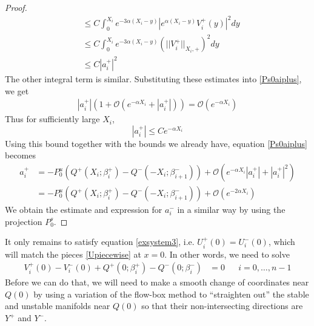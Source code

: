 \documentclass[thesis.tex]{subfiles}
\begin{document}
\begin{lemma}
\begin{proof}
\begin{align*}
&\leq C \int_0^{X_i}e^{-3 \alpha (X_i - y)} |e^{\alpha(X_i - y)} V_i^+(y)|^2 dy \\
&\leq C \int_0^{X_i}e^{-3 \alpha (X_i - y)} (||V_i^+||_{X_i, +})^2 dy \\
&\leq C |a_i^+|^2
\end{align*}
The other integral term is similar. Substituting these estimates into \eqref{Ps0aiplus}, we get
\begin{align*}
|a_i^+|\left(1 + \mathcal{O}(e^{-\alpha X_i} + |a_i^+|) \right) =  
\mathcal{O}( e^{-\alpha X_i} )
\end{align*}
Thus for sufficiently large $X_i$, 
\[
|a_i^+| \leq C e^{-\alpha X_i}
\]
Using this bound together with the bounds we already have, equation \eqref{Ps0aiplus} becomes
\begin{align*}
a_i^+ &= -P^u_0 \left( Q^+(X_i; \beta_i^+) - Q^-(-X_i; \beta_{i+1}^-) \right) 
+ \mathcal{O}\left( e^{-\alpha X_i} |a_i^+| + |a_i^+|^2 \right) \\
&= -P^u_0 \left( Q^+(X_i; \beta_i^+) - Q^-(-X_i; \beta_{i+1}^-) \right) 
+ \mathcal{O}\left( e^{-2 \alpha X_i} \right)
\end{align*}
We obtain the estimate and expression for $a_i^-$ in a similar way by using the projection $P_0^s$.
\end{proof}
\end{lemma}

It only remains to satisfy equation \eqref{exsystem3}, i.e. $U_i^+(0) = U_i^-(0)$, which will match the pieces \eqref{Upiecewise} at $x = 0$. In other words, we need to solve
\begin{align}\label{Umatchat0}
V_i^+(0) - V_i^-(0) + Q^+(0; \beta_i^+) - Q^-(0; \beta_i^-) &= 0  && i = 0, \dots, n-1
\end{align}
Before we can do that, we will need to make a smooth change of coordinates near $Q(0)$ by using a variation of the flow-box method to ``straighten out'' the stable and unstable manifolds near $Q(0)$ so that their non-intersecting directions are $Y^+$ and $Y^-$.

\end{document}
